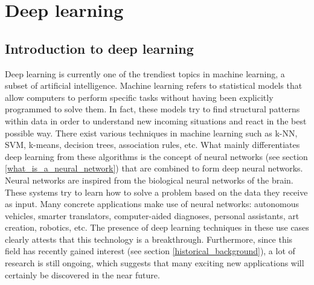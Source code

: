 
\chapter{Deep learning}
\label{ch:deep_learning}

\section{Introduction to deep learning}
Deep learning is currently one of the trendiest topics in machine learning, a subset of artificial intelligence. Machine learning refers to statistical models that allow computers to perform specific tasks without having been explicitly programmed to solve them. In fact, these models try to find structural patterns within data in order to understand new incoming situations and react in the best possible way. There exist various techniques in machine learning such as k-NN, SVM, k-means, decision trees, association rules, etc. What mainly differentiates deep learning from these algorithms is the concept of neural networks (see section  \ref{what_is_a_neural_network}) that are combined to form deep neural networks.\\
Neural networks are inspired from the biological neural networks of the brain. These systems try to learn how to solve a problem based on the data they receive as input. Many concrete applications make use of neural networks: autonomous vehicles, smarter translators, computer-aided diagnoses, personal assistants, art creation, robotics, etc. The presence of deep learning techniques in these use cases clearly attests that this technology is a breakthrough. Furthermore, since this field has recently gained interest (see section \ref{historical_background}), a lot of research is still ongoing, which suggests that many exciting new applications will certainly be discovered in the near future.

